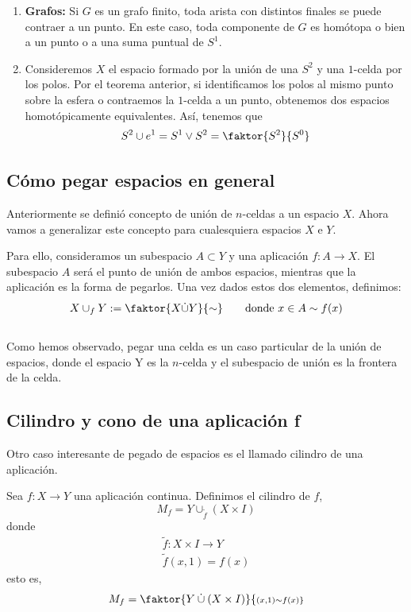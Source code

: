 \begin{ejems}
\begin{enumerate}
\item \textbf{Grafos:} 
Si $G$ es un grafo finito, toda arista con distintos finales se puede contraer a un punto. En este caso, toda componente de $G$ es homótopa o bien a un punto o a una suma puntual de $S^1$.

\item Consideremos $X$ el espacio formado por la unión de una $S^2$ y una $1$-celda por los polos. Por el teorema anterior, si identificamos los polos al mismo punto sobre la esfera o contraemos la $1$-celda a un punto, obtenemos dos espacios homotópicamente equivalentes. Así, tenemos que
\[ S^2 \cup e^1 = S^1 \vee S^2 = \faktor{S^2}{S^0} \]

\end{enumerate}
\end{ejems}

\subsection{Cómo pegar espacios en general}
Anteriormente se definió concepto de unión de $n$-celdas a un espacio $X$. Ahora vamos a generalizar este concepto para cualesquiera espacios $X$ e $Y$. \par 
Para ello, consideramos un subespacio $A \subset Y $ y una aplicación $f : A \longrightarrow X$. El subespacio $A$ será el punto de unión de ambos espacios, mientras que la aplicación es la forma de pegarlos. Una vez dados estos dos elementos, definimos:
\[ X \cup_f Y := \faktor{X \dot{\cup} Y}{\sim} \qquad \text{donde }x \in A \sim f(x) \]
 \\
Como hemos observado, pegar una celda es un caso particular de la unión de espacios, donde el espacio Y es la $n$-celda y el subespacio de unión es la frontera de la celda. 
\subsection*{Cilindro y cono de una aplicación f}
Otro caso interesante de pegado de espacios es el llamado cilindro de una aplicación. \par
Sea $f: X \longrightarrow Y$ una aplicación continua. Definimos el cilindro de $f$, 
\[M_f = Y \cup_{\tilde{f}} (X \times I) \] 
donde
\begin{align*}
\tilde{f} : X \times I \longrightarrow Y \\
\tilde{f}(x,1) = f(x)
\end{align*}
esto es, 
\[ M_f = \faktor{Y \: \dot{\cup} \: (X \times I)}{\scriptstyle(x,1) \sim f(x)} \]

